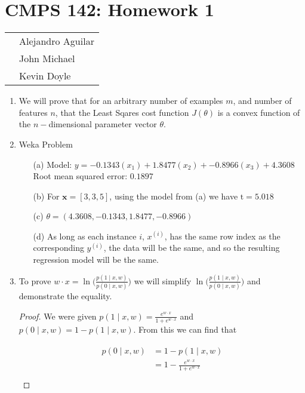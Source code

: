 \documentclass[12pt]{article}
\begin{document}
\section*{CMPS 142: Homework 1}

\begin{tabular}{p{10cm} l}
    & Alejandro Aguilar \\
    & John Michael \\
    & Kevin Doyle \\
\end{tabular}
    
\begin{enumerate}
  \item We will prove that for an arbitrary number of examples $m$, and number of features $n$, that the Least Sqares cost function $J(\theta)$ is a convex function of the $n-$dimensional parameter vector $\theta$.
  \item Weka Problem
  	\begin{enumerate}
  	\item[(a)] Model: $y= -0.1343(x_1) + 1.8477(x_2) + -0.8966(x_3) + 4.3608$ \\
  	Root mean squared error: $0.1897$
  	\item[(b)] For $\textbf{x} = [3,3,5]$, using the model from (a) we have $\text{\^{t}} = 5.018$
  	\item[(c)] $\theta = (4.3608, -0.1343, 1.8477, -0.8966)$ 
  	\item[(d)] As long as each instance $i$, $x^{(i)}$, has the same row index as the corresponding $y^{(i)}$, the data will be the same, and so the resulting regression model will be the same. 
  	\end{enumerate}
  \item To prove $ w \cdot x = \ln\big(\frac{p(1\mid x,w)}{p(0\mid x,w)}\big) $ we will simplify $\ln\big(\frac{p(1\mid x,w)}{p(0\mid x,w)}\big)$ and demonstrate the equality.
  
   \begin{proof}We were given $p(1\mid x,w) =\frac{e^{w \cdot x}}{1 + e^{w \cdot x}}$ and $p(0\mid x,w) = 1 - p(1\mid x,w)$. From this we can find that 
    
	\begin{align*}
	\begin{split}
	p(0\mid x,w) &= 1 - p(1\mid x,w) \\
	&= 1 - \frac{e^{w \cdot x}}{1 + e^{w \cdot x}} \\
	\end{split}
	\end{align*}
   
  
   \end{proof}
\end{enumerate}
\end{document}
